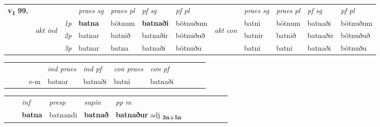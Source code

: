 \begin{tabular}{llllllllllll} \toprule
\multirow{4}{*}{{{\textbf{v{\textsubscript{1}}} \Large{\textbf{99.}}}}}  & &   &  \textit{praes sg}  & \textit{praes pl}  &\textit{ pf sg} & \textit{pf pl} &  &  \textit{praes sg}  & \textit{praes pl}  & \textit{pf sg} & \textit{pf pl } \\*
	\cmidrule{4-7} \cmidrule{9-12}
 & \multirow{3}{*}{\begin{turn}{90}\textit{akt ind}\end{turn}} & {\textit{1p}} & \textbf{batna} & bötnum    & \textbf{batnaði} & bötnuðum & \multirow{3}{*}{\begin{turn}{90}\textit{akt con}\end{turn}} &batni & bötnum & batnaði & bötnuðum\\*
& &  {\textit{2p}} &  batnar  & batnið   & batnaðir & bötnuðuð & & batnir & batnið & batnaðir & bötnuðuð \\*
& &  {\textit{3p}} & batnar & batna   & batnaði & bötnuðu & & batni & batni& batnaði & bötnuðu  \\*
\cmidrule{4-7} \cmidrule{9-12}
\end{tabular}


\begin{tabular}{llllllllllll}
 & &  & &  \textit{ind praes} & \textit{ind pf} & \textit{con praes} & \textit{con pf} \\*
&  & & e-m & batnar & batnaði & batni & batnaði \\*
\cmidrule{5-9}
\end{tabular}


\begin{tabular}{llllllllllll}
 & & \textit{inf}     & \textit{presp} & \textit{supin}  & \textit{pp m}     \\*
  & & \textbf{batna}      & batnandi &  \textbf{batnað}  & \textbf{batnaður} adj \textbf{\textsubscript{3a+5a}} \\*
\cmidrule{1-12}
\end{tabular}



